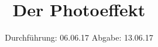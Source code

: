 

\subject{V500}
\title{Der Photoeffekt}
\date{
  Durchführung: 06.06.17
  \hspace{3em}
  Abgabe: 13.06.17
}



\maketitle
\thispagestyle{empty}
\tableofcontents
\newpage






\printbibliography



